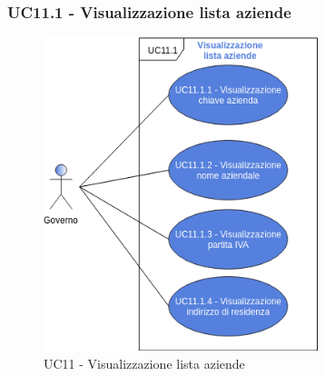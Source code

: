  \subsubsection{UC11.1 - Visualizzazione lista aziende}
 \begin{figure}[h]
 	\includegraphics[width=8cm]{res/images/UC11-1.png} 
 	\centering
 	\caption{UC11 - Visualizzazione lista aziende}
 	
 \end{figure}
